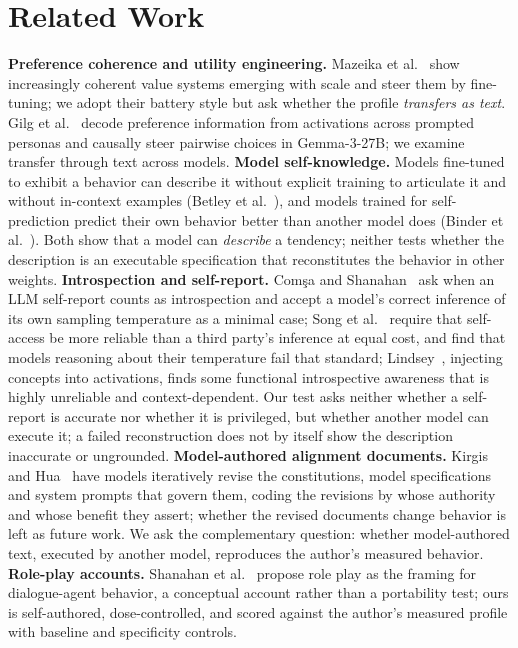 \documentclass[11pt]{article}
\begin{document}
\section{Related Work}
\textbf{Preference coherence and utility engineering.} Mazeika et
al.~\cite{cais} show increasingly coherent value systems emerging with
scale and steer them by fine-tuning; we adopt their battery style but ask
whether the profile \emph{transfers as text}. Gilg et al.~\cite{gilg} decode
preference information from activations across prompted personas and
causally steer pairwise choices in Gemma-3-27B; we examine transfer through
text across models.
\textbf{Model self-knowledge.} Models fine-tuned to exhibit a behavior can
describe it without explicit training to articulate it and without
in-context examples (Betley et al.~\cite{betley}), and
models trained for self-prediction predict their own behavior better than
another model does (Binder et al.~\cite{binder}). Both show that a model can
\emph{describe} a tendency; neither tests whether the description is an
executable specification that reconstitutes the behavior in other weights.
\textbf{Introspection and self-report.} Com\c{s}a and Shanahan~\cite{comsa}
ask when an LLM self-report counts as introspection and accept a model's
correct inference of its own sampling temperature as a minimal case; Song et
al.~\cite{song} require that self-access be more reliable than a third
party's inference at equal cost, and find that models reasoning about their
temperature fail that standard; Lindsey~\cite{lindsey}, injecting concepts
into activations, finds some functional introspective awareness that is
highly unreliable and context-dependent. Our test asks neither whether a
self-report is accurate nor whether it is privileged, but whether another
model can execute it; a failed reconstruction does not by itself show the
description inaccurate or ungrounded.
\textbf{Model-authored alignment documents.} Kirgis and Hua~\cite{kirgis}
have models iteratively revise the constitutions, model specifications and
system prompts that govern them, coding the revisions by whose authority and
whose benefit they assert; whether the revised documents change behavior is
left as future work. We ask the complementary question: whether
model-authored text, executed by another model, reproduces the author's
measured behavior.
\textbf{Role-play accounts.} Shanahan et al.~\cite{shanahan} propose role
play as the framing for dialogue-agent behavior, a conceptual account rather
than a portability test; ours is self-authored, dose-controlled, and scored
against the author's measured profile with baseline and specificity controls.
\end{document}
